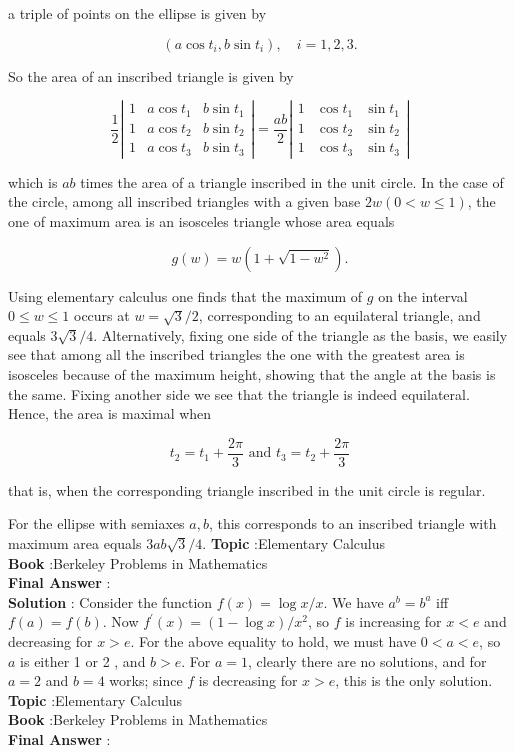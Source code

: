\documentclass[10pt]{article}
\begin{document}
a triple of points on the ellipse is given by

$$
\left(a \cos t_{i}, b \sin t_{i}\right), \quad i=1,2,3 .
$$

So the area of an inscribed triangle is given by

$$
\frac{1}{2}\left|\begin{array}{lll}
1 & a \cos t_{1} & b \sin t_{1} \\
1 & a \cos t_{2} & b \sin t_{2} \\
1 & a \cos t_{3} & b \sin t_{3}
\end{array}\right|=\frac{a b}{2}\left|\begin{array}{lll}
1 & \cos t_{1} & \sin t_{1} \\
1 & \cos t_{2} & \sin t_{2} \\
1 & \cos t_{3} & \sin t_{3}
\end{array}\right|
$$

which is $a b$ times the area of a triangle inscribed in the unit circle. In the case of the circle, among all inscribed triangles with a given base $2 w(0<w \leqslant 1)$, the one of maximum area is an isosceles triangle whose area equals

$$
g(w)=w\left(1+\sqrt{1-w^{2}}\right) .
$$

Using elementary calculus one finds that the maximum of $g$ on the interval $0 \leqslant w \leqslant 1$ occurs at $w=\sqrt{3} / 2$, corresponding to an equilateral triangle, and equals $3 \sqrt{3} / 4$. Alternatively, fixing one side of the triangle as the basis, we easily see that among all the inscribed triangles the one with the greatest area is isosceles because of the maximum height, showing that the angle at the basis is the same. Fixing another side we see that the triangle is indeed equilateral. Hence, the area is maximal when

$$
t_{2}=t_{1}+\frac{2 \pi}{3} \text { and } t_{3}=t_{2}+\frac{2 \pi}{3}
$$

that is, when the corresponding triangle inscribed in the unit circle is regular.

For the ellipse with semiaxes $a, b$, this corresponds to an inscribed triangle with maximum area equals $3 a b \sqrt{3} / 4$.
\textbf{Topic} :Elementary Calculus \\
\textbf{Book} :Berkeley Problems in Mathematics\\
\textbf{Final Answer} :\\


\textbf{Solution} : Consider the function $f(x)=\log x / x$. We have $a^{b}=b^{a}$ iff $f(a)=f(b)$. Now $f^{\prime}(x)=(1-\log x) / x^{2}$, so $f$ is increasing for $x<e$ and decreasing for $x>e$. For the above equality to hold, we must have $0<a<e$, so $a$ is either 1 or 2 , and $b>e$. For $a=1$, clearly there are no solutions, and for $a=2$ and $b=4$ works; since $f$ is decreasing for $x>e$, this is the only solution. \\
\textbf{Topic} :Elementary Calculus \\
\textbf{Book} :Berkeley Problems in Mathematics\\
\textbf{Final Answer} :\\
\end{document}
